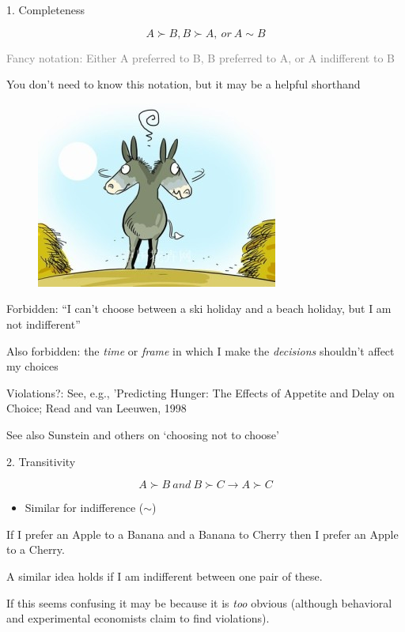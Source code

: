 \documentclass[table]{beamer}
\providecommand{\tightlist}{%
  \setlength{\itemsep}{0pt}\setlength{\parskip}{0pt}}
\begin{document}
\begin{frame}

\begin{block}{1. Completeness}

\[A \succ B, B \succ A, \: or \: A \sim B \]

\medskip

\textcolor{gray}{Fancy notation: Either A preferred to B, B preferred to A, or A indifferent to B}

You don't need to know this notation, but it may be a helpful shorthand

\begin{figure}

{\centering \includegraphics[width=0.5\linewidth]{picsfigs/donkeybales} 

}

\end{figure}

Forbidden: ``I can't choose between a ski holiday and a beach holiday,
but I am not indifferent''

Also forbidden: the \emph{time} or \emph{frame} in which I make the
\emph{decisions} shouldn't affect my choices

Violations?: See, e.g., 'Predicting Hunger: The Effects of Appetite and
Delay on Choice; Read and van Leeuwen, 1998

See also Sunstein and others on `choosing not to choose'

\end{block}

\end{frame}

\begin{frame}

\begin{block}{2. Transitivity}

\[ A \succ B \: and \: B \succ C \rightarrow A \succ C \]

\begin{itemize}
\tightlist
\item
  Similar for indifference (\(\sim\))
\end{itemize}

If I prefer an Apple to a Banana and a Banana to Cherry then I prefer an
Apple to a Cherry.

A similar idea holds if I am indifferent between one pair of these.

If this seems confusing it may be because it is \emph{too} obvious
(although behavioral and experimental economists claim to find
violations).

\end{block}

\end{frame}
\end{document}
